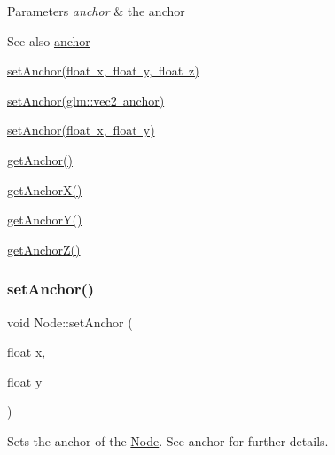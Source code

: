 \begin{DoxyParams}{Parameters}
{\em anchor} & the anchor \\
\hline
\end{DoxyParams}
\begin{DoxySeeAlso}{See also}
\mbox{\hyperlink{classsage_1_1Node_a8698d732514fa2caba0ccee46dbae17a}{anchor}} 

\mbox{\hyperlink{classsage_1_1Node_a04d15cec594320725e6ef44756346d2a}{set\+Anchor(float x, float y, float z)}} 

\mbox{\hyperlink{classsage_1_1Node_a957a7e578660950b8518926239397ea0}{set\+Anchor(glm\+::vec2 anchor)}} 

\mbox{\hyperlink{classsage_1_1Node_a8813a645a74f6ab59b25d434e65035c6}{set\+Anchor(float x, float y)}} 

\mbox{\hyperlink{classsage_1_1Node_a1314e39981d8adee8a75c96f29c9e181}{get\+Anchor()}} 

\mbox{\hyperlink{classsage_1_1Node_aa5f31c33d60b32b618d3beaf4e5c6c51}{get\+Anchor\+X()}} 

\mbox{\hyperlink{classsage_1_1Node_a78c5f86d0081854603178fb52d8c0a9b}{get\+Anchor\+Y()}} 

\mbox{\hyperlink{classsage_1_1Node_a13d0e0b056b8e29091e385f17f8c62f6}{get\+Anchor\+Z()}} 
\end{DoxySeeAlso}
\mbox{\label{classsage_1_1Node_a8813a645a74f6ab59b25d434e65035c6}} 
\subsubsection{\texorpdfstring{setAnchor()}{setAnchor()}\hspace{0.1cm}{\footnotesize\ttfamily [3/4]}}
{\footnotesize\ttfamily void Node\+::set\+Anchor (\begin{DoxyParamCaption}\item[{float}]{x,  }\item[{float}]{y }\end{DoxyParamCaption})}



Sets the anchor of the \mbox{\hyperlink{classsage_1_1Node}{Node}}. See anchor for further details. 


